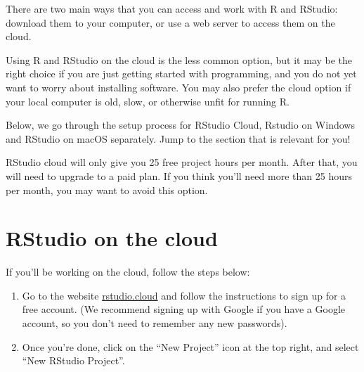 \documentclass[
  letterpaper,
  DIV=11,
  numbers=noendperiod]{scrreprt}
\begin{document}
There are two main ways that you can access and work with R and RStudio:
download them to your computer, or use a web server to access them on
the cloud.

Using R and RStudio on the cloud is the less common option, but it may
be the right choice if you are just getting started with programming,
and you do not yet want to worry about installing software. You may also
prefer the cloud option if your local computer is old, slow, or
otherwise unfit for running R.

Below, we go through the setup process for RStudio Cloud, Rstudio on
Windows and RStudio on macOS separately. Jump to the section that is
relevant for you!

\begin{tcolorbox}[enhanced jigsaw, title=\textcolor{quarto-callout-caution-color}{\faFire}\hspace{0.5em}{Watch Out}, colbacktitle=quarto-callout-caution-color!10!white, leftrule=.75mm, arc=.35mm, opacityback=0, bottomrule=.15mm, rightrule=.15mm, toptitle=1mm, breakable, toprule=.15mm, colback=white, coltitle=black, colframe=quarto-callout-caution-color-frame, bottomtitle=1mm, titlerule=0mm, left=2mm, opacitybacktitle=0.6]

RStudio cloud will only give you 25 free project hours per month. After
that, you will need to upgrade to a paid plan. If you think you'll need
more than 25 hours per month, you may want to avoid this option.

\end{tcolorbox}

\section{RStudio on the cloud}\label{rstudio-on-the-cloud}

If you'll be working on the cloud, follow the steps below:

\begin{enumerate}
\def\labelenumi{\arabic{enumi}.}
\item
  Go to the website \href{https://rstudio.cloud}{rstudio.cloud} and
  follow the instructions to sign up for a free account. (We recommend
  signing up with Google if you have a Google account, so you don't need
  to remember any new passwords).
\item
  Once you're done, click on the ``New Project'' icon at the top right,
  and select ``New RStudio Project''.
\end{enumerate}
\end{document}
